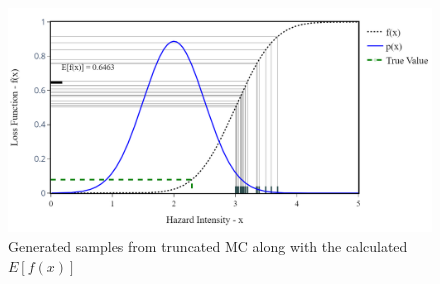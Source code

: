     \begin{figure}[H]
        \centering
        \includegraphics[scale=0.5]{Figures/Images/Illustrative Example/truncated_MC_samples.png}
        \caption{Generated samples from truncated MC along with the calculated $E[f(x)]$}
        \label{fig:truncated_MC_samples}
    \end{figure}